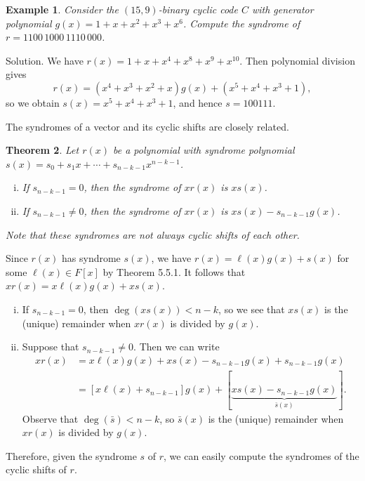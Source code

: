 \documentclass[10pt]{article}
\makeatletter
\theoremstyle{newstyle}
\newtheorem{thm}{Theorem}[subsection]
\newtheorem{exmp}[thm]{Example}
\newenvironment{pf}[1][\proofname]{\par
  \pushQED{\qed}%
  \normalfont \topsep0\p@\relax
  \trivlist
  \item[\hskip\labelsep\scshape
  #1\@addpunct{.}]\ignorespaces
}{%
  \popQED\endtrivlist\@endpefalse
}
\makeatother
\begin{document}
\begin{exmp}
Consider the $(15, 9)$-binary cyclic code $C$ with generator polynomial 
$g(x) = 1+x+x^2+x^3+x^6$. Compute the syndrome of $r = 1100\,1000\,1110\,000$. 
\end{exmp}

{\sc Solution.} We have $r(x) = 1+x+x^4 + x^8 + x^9 + x^{10}$. Then polynomial division gives 
\[ r(x) = (x^4 + x^3 + x^2 + x)g(x) + (x^5 + x^4 + x^3 + 1), \]
so we obtain $s(x) = x^5 + x^4 + x^3 + 1$, and hence $s = 100111$. 

The syndromes of a vector and its cyclic shifts are closely related. 

\begin{thm}
Let $r(x)$ be a polynomial with syndrome polynomial $s(x) = s_0 + s_1x + \cdots + s_{n-k-1} x^{n-k-1}$. 
\begin{enumerate}[(i)]
    \item If $s_{n-k-1} = 0$, then the syndrome of $xr(x)$ is $xs(x)$. 
    \item If $s_{n-k-1} \neq 0$, then the syndrome of $xr(x)$ is $xs(x) - s_{n-k-1}g(x)$. 
\end{enumerate}
Note that these syndromes are not always cyclic shifts of each other. 
\end{thm}
\begin{pf}
Since $r(x)$ has syndrome $s(x)$, we have $r(x) = \ell(x)g(x) + s(x)$ for some 
$\ell(x) \in F[x]$ by Theorem 5.5.1. It follows that 
$xr(x) = x\ell(x)g(x) + xs(x)$. 
\begin{enumerate}[(i)]
    \item If $s_{n-k-1} = 0$, then $\deg(xs(x)) < n-k$, so we see that $xs(x)$ is the (unique) remainder 
    when $xr(x)$ is divided by $g(x)$. 
    \item Suppose that $s_{n-k-1} \neq 0$. Then we can write 
    \begin{align*}
        xr(x) &= x\ell(x)g(x) + xs(x) - s_{n-k-1}g(x) + s_{n-k-1}g(x) \\
        &= [x\ell(x) + s_{n-k-1}]g(x) + [\underbrace{xs(x) - s_{n-k-1}g(x)}_{\bar{s}(x)}].
    \end{align*}
    Observe that $\deg(\bar s) < n-k$, so $\bar s(x)$ is the (unique) remainder when $xr(x)$ is divided 
    by $g(x)$. \qedhere 
\end{enumerate}
\end{pf}

Therefore, given the syndrome $s$ of $r$, we can easily compute the syndromes of the cyclic 
shifts of $r$. 
\end{document}
